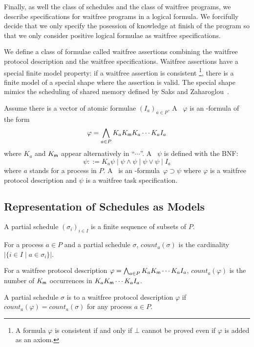   Finally, as well the class of schedules and the class of waitfree programs,
  we describe specifications for waitfree programs in a logical formula.
  We forcifully decide that we only specify the posession of knowledge at finish of the
  program so that we only consider positive logical formulae as waitfree specifications.

  We define a class of formulae called waitfree assertions combining the waitfree protocol
  description and the waitfree specifications.
  Waitfree assertions have a special finite model property:
  if a waitfree assertion is consistent%
  \footnote{A formula $\varphi$ is consistent if and only if $\bot$ cannot be proved even if
  $\varphi$ is added as an axiom.}, there is a finite model of a special shape
  where the assertion is valid.
  The special shape mimics the scheduling of shared memory
  defined by Saks and Zaharoglou~\cite{saks2000wait}.

  \begin{definition}
   Assume there is a vector of atomic formulae $(I_a)_{a\in P}$.
   A~ $\varphi$ is an \iec-formula of the form
   \[
   \varphi = \bigwedge_{a\in P} K_a K_{\sf m} K_a \cdots K_a I_a
   \]
   where $K_a$ and $K_{\sf m}$ appear alternatively in ``$\cdots$''.
   A~ $\psi$ is defined with the BNF:
   \[
   \psi ::= K_a\psi\mid \psi\land\psi\mid \psi\vee\psi\mid I_a
   \]
   where $a$ stands for a process in $P$.
   A~ is an \iec-formula~$\varphi\supset\psi$ where $\varphi$ is a
   waitfree protocol description and $\psi$ is a waitfree task specification.
  \end{definition}

  \subsection{Representation of Schedules as Models}

  \begin{definition}
   A partial schedule $(\sigma_i)_{i\in I}$ is a finite sequence of
   subsets of $P$.
  \end{definition}

  \begin{definition}
   For a process $a\in P$ and a partial schedule $\sigma$, $count_a(\sigma)$ is the cardinality
   $\left|\{i\in I\mid a\in \sigma_i\}\right|$.

   For a waitfree protocol description $\varphi = \bigwedge_{a\in P}K_a K_{\sf m} \cdots K_a I_a$,
   $count_a(\varphi)$ is the number of $K_{\sf m}$ occurrences in $K_aK_{\sf m} \cdots
   K_a I_a$.

   A partial schedule $\sigma$ is  to a waitfree
   protocol description $\varphi$ if
   $count_a(\varphi) = count_a(\sigma)$ for any process $a\in P$.
  \end{definition}

